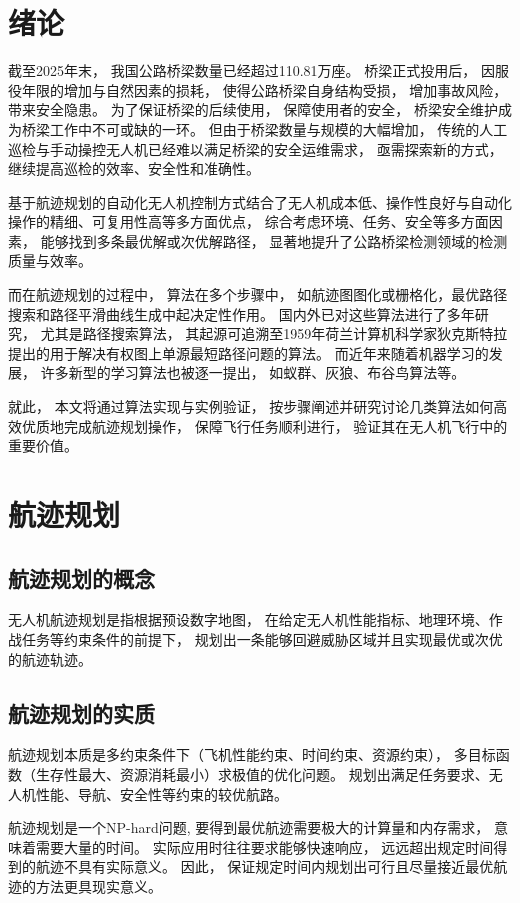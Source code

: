 \documentclass[12pt,a4paper,oneside,UTF8]{ctexart}
\begin{document}
\newpage\section{绪论}
截至2025年末，
我国公路桥梁数量已经超过110.81万座\cite{ref1}。
桥梁正式投用后，
因服役年限的增加与自然因素的损耗，
使得公路桥梁自身结构受损，
增加事故风险，
带来安全隐患。
为了保证桥梁的后续使用，
保障使用者的安全，
桥梁安全维护成为桥梁工作中不可或缺的一环。
但由于桥梁数量与规模的大幅增加，
传统的人工巡检与手动操控无人机已经难以满足桥梁的安全运维需求，
亟需探索新的方式，继续提高巡检的效率、安全性和准确性\cite{ref2}。

基于航迹规划的自动化无人机控制方式结合了无人机成本低、操作性良好与自动化操作的精细、可复用性高等多方面优点，
综合考虑环境、任务、安全等多方面因素，
能够找到多条最优解或次优解路径，
显著地提升了公路桥梁检测领域的检测质量与效率。

而在航迹规划的过程中，
算法在多个步骤中，
如航迹图图化或栅格化，最优路径搜索和路径平滑曲线生成中起决定性作用。
国内外已对这些算法进行了多年研究，
尤其是路径搜索算法，
其起源可追溯至1959年荷兰计算机科学家狄克斯特拉提出的用于解决有权图上单源最短路径问题的算法。
而近年来随着机器学习的发展，
许多新型的学习算法也被逐一提出，
如蚁群、灰狼、布谷鸟算法等。

就此，
本文将通过算法实现与实例验证，
按步骤阐述并研究讨论几类算法如何高效优质地完成航迹规划操作，
保障飞行任务顺利进行，
验证其在无人机飞行中的重要价值。
\newpage\section{航迹规划}

\subsection{航迹规划的概念}
无人机航迹规划是指根据预设数字地图，
在给定无人机性能指标、地理环境、作战任务等约束条件的前提下，
规划出一条能够回避威胁区域并且实现最优或次优的航迹轨迹。

\subsection{航迹规划的实质}
航迹规划本质是多约束条件下（飞机性能约束、时间约束、资源约束），
多目标函数（生存性最大、资源消耗最小）求极值的优化问题。
规划出满足任务要求、无人机性能、导航、安全性等约束的较优航路。

航迹规划是一个NP-hard问题,
要得到最优航迹需要极大的计算量和内存需求，
意味着需要大量的时间。
实际应用时往往要求能够快速响应，
远远超出规定时间得到的航迹不具有实际意义。
因此，
保证规定时间内规划出可行且尽量接近最优航迹的方法更具现实意义。
\end{document}
